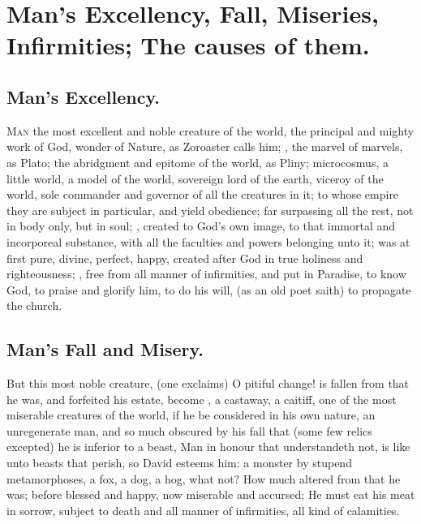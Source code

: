 {%
\section[Man's Excellency, Fall, Miseries]{Man's Excellency, Fall, Miseries, Infirmities; The causes of them.}

\subsection{Man's Excellency.}
\lettrine[image,lines=5,findent=5pt,nindent=0pt]{M}{an} the most excellent and noble creature of the world, the principal and mighty work of God, wonder of Nature, 
as Zoroaster calls him; , the marvel of marvels,
as Plato; the abridgment and epitome of the world,
as Pliny; microcosmus, a little world, a model of the world, sovereign lord of the earth, viceroy of the world, sole commander and governor of all the creatures in it; to whose empire they are subject in particular, and yield obedience; far surpassing all the rest, not in body only, but in soul; , created to God's own image, to that immortal and incorporeal substance, with all the faculties and powers belonging unto it; was at first pure, divine, perfect, happy, created after God in true holiness and righteousness; , free from all manner of infirmities, and put in Paradise, to know God, to praise and glorify him, to do his will,  (as an old poet saith) to propagate the church.

\subsection{Man's Fall and Misery.}
But this most noble creature,  (one exclaims) O pitiful change! is fallen from that he was, and forfeited his estate, become , a castaway, a caitiff, one of the most miserable creatures of the world, if he be considered in his own nature, an unregenerate man, and so much obscured by his fall that (some few relics excepted) he is inferior to a beast, Man in honour that understandeth not, is like unto beasts that perish, so David esteems him: a monster by stupend metamorphoses, a fox, a dog, a hog, what not?  How much altered from that he was; before blessed and happy, now miserable and accursed; He must eat his meat in sorrow, subject to death and all manner of infirmities, all kind of calamities.

}
